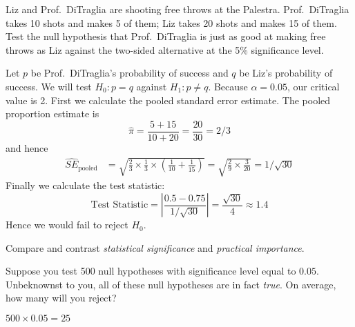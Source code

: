 \documentclass[addpoints,12pt]{exam}
\begin{document}
\begin{questions}

\question Liz and Prof.\ DiTraglia are shooting free throws at the Palestra. Prof.\ DiTraglia takes 10 shots and makes 5 of them; Liz takes 20 shots and makes 15 of them. Test the null hypothesis that Prof.\ DiTraglia is just as good at making free throws as Liz against the two-sided alternative at the 5\% significance level. 
\begin{solution}
  Let $p$ be Prof.\ DiTraglia's probability of success and $q$ be Liz's probability of success.
  We will test $H_0\colon p = q$ against $H_1\colon p \neq q$.
  Because $\alpha = 0.05$, our critical value is 2.
  First we calculate the pooled standard error estimate.
  The pooled proportion estimate is
  \[
    \widehat{\pi} = \frac{5 + 15}{10 + 20} = \frac{20}{30} = 2/3 
  \]
  and hence
  \begin{align*}
    \widehat{SE}_{\text{pooled}} &= 
    \sqrt{\frac{2}{3} \times \frac{1}{3}  \times \left( \frac{1}{10} + \frac{1}{15} \right)} 
    = \sqrt{\frac{2}{9} \times \frac{3}{20}} = 1/\sqrt{30}
  \end{align*}
  Finally we calculate the test statistic:
  \[
    \text{Test Statistic} = \left|\frac{0.5 - 0.75}{1/\sqrt{30}}\right| = \frac{\sqrt{30}}{4} \approx 1.4
  \]
  Hence we would fail to reject $H_0$.
\end{solution}

\question Compare and contrast \emph{statistical significance} and \emph{practical importance}.

\question Suppose you test 500 null hypotheses with significance level equal to $0.05$. Unbeknownst to you, all of these null hypotheses are in fact \emph{true}. On average, how many will you reject?
\begin{solution}
  $500 \times 0.05 = 25$
\end{solution}


\end{questions}
\end{document}
